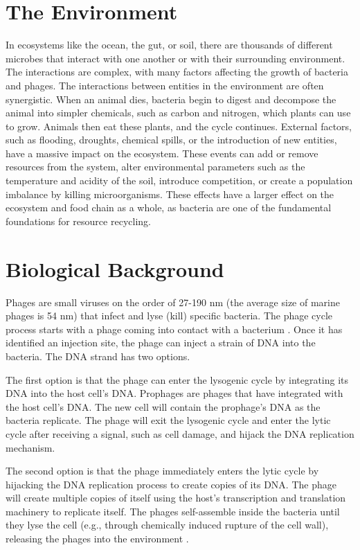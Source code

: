 \section{The Environment}
In ecosystems like the ocean, the gut, or soil, there are thousands of different microbes that interact with one another or with their surrounding environment.
The interactions are complex, with many factors affecting the growth of bacteria and phages. 
The interactions between entities in the environment are often synergistic. 
When an animal dies, bacteria begin to digest and decompose the animal into simpler chemicals, such as carbon and nitrogen, which plants can use to grow. 
Animals then eat these plants, and the cycle continues. 
External factors, such as flooding, droughts, chemical spills, or the introduction of new entities, have a massive impact on the ecosystem. 
These events can add or remove resources from the system, alter environmental parameters such as the temperature and acidity of the soil, introduce competition, or create a population imbalance by killing microorganisms. 
These effects have a larger effect on the ecosystem and food chain as a whole, as bacteria are one of the fundamental foundations for resource recycling. 

\section{Biological Background}
Phages are small viruses on the order of 27-190 nm (the average size of marine phages is 54 nm) that infect and lyse (kill) specific bacteria.
The phage cycle process starts with a phage coming into contact with a bacterium .
Once it has identified an injection site, the phage can inject a strain of DNA into the bacteria.
The DNA strand has two options. 

The first option is that the phage can enter the lysogenic cycle by integrating its DNA into the host cell’s DNA. 
Prophages are phages that have integrated with the host cell’s DNA. 
The new cell will contain the prophage’s DNA as the bacteria replicate. 
The phage will exit the lysogenic cycle and enter the lytic cycle after receiving a signal, such as cell damage, and hijack the DNA replication mechanism. 

The second option is that the phage immediately enters the lytic cycle by hijacking the DNA replication process to create copies of its DNA. 
The phage will create multiple copies of itself using the host’s transcription and translation machinery to replicate itself.
The phages self-assemble inside the bacteria until they lyse the cell (e.g., through chemically induced rupture of the cell wall), releasing the phages into the environment \cite{campbellFutureBacteriophageBiology2003}. 

